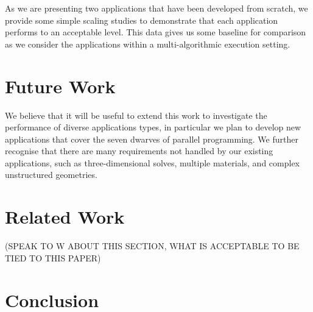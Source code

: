 \documentclass[runningheads,a4paper]{llncs}
\begin{document}
As we are presenting two applications that have been developed from scratch, we provide some simple scaling studies to demonstrate that each application performs to an acceptable level. This data gives us some baseline for comparison as we consider the applications within a multi-algorithmic execution setting.



\section{Future Work}

We believe that it will be useful to extend this work to investigate the performance of diverse applications types, in particular we plan to develop new applications that cover the seven dwarves of parallel programming. We further recognise that there are many requirements not handled by our existing applications, such as three-dimensional solves, multiple materials, and complex unstructured geometries.

\section{Related Work}

(SPEAK TO W ABOUT THIS SECTION, WHAT IS ACCEPTABLE TO BE TIED TO THIS PAPER)

\section{Conclusion}



\end{document}
